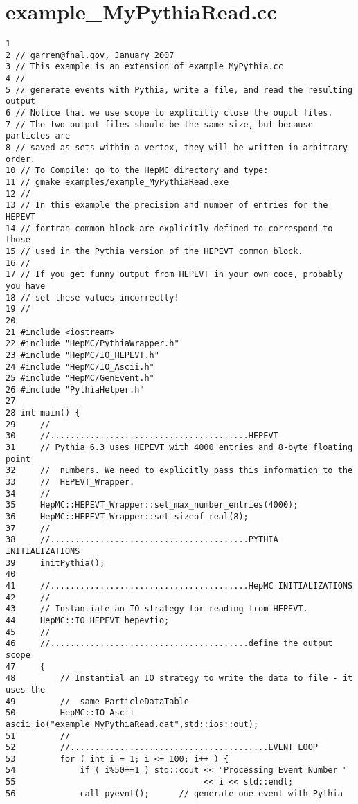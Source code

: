 \section{example\_\-My\-Pythia\-Read.cc}


\begin{DocInclude}\begin{verbatim}1 
2 // garren@fnal.gov, January 2007
3 // This example is an extension of example_MyPythia.cc
4 //  
5 // generate events with Pythia, write a file, and read the resulting output
6 // Notice that we use scope to explicitly close the ouput files.
7 // The two output files should be the same size, but because particles are
8 // saved as sets within a vertex, they will be written in arbitrary order.
10 // To Compile: go to the HepMC directory and type:
11 // gmake examples/example_MyPythiaRead.exe
12 //
13 // In this example the precision and number of entries for the HEPEVT 
14 // fortran common block are explicitly defined to correspond to those 
15 // used in the Pythia version of the HEPEVT common block. 
16 //
17 // If you get funny output from HEPEVT in your own code, probably you have
18 // set these values incorrectly!
19 //
20 
21 #include <iostream>
22 #include "HepMC/PythiaWrapper.h"
23 #include "HepMC/IO_HEPEVT.h"
24 #include "HepMC/IO_Ascii.h"
25 #include "HepMC/GenEvent.h"
26 #include "PythiaHelper.h"
27 
28 int main() { 
29     //
30     //........................................HEPEVT
31     // Pythia 6.3 uses HEPEVT with 4000 entries and 8-byte floating point
32     //  numbers. We need to explicitly pass this information to the 
33     //  HEPEVT_Wrapper.
34     //
35     HepMC::HEPEVT_Wrapper::set_max_number_entries(4000);
36     HepMC::HEPEVT_Wrapper::set_sizeof_real(8);
37     //
38     //........................................PYTHIA INITIALIZATIONS
39     initPythia();
40 
41     //........................................HepMC INITIALIZATIONS
42     //
43     // Instantiate an IO strategy for reading from HEPEVT.
44     HepMC::IO_HEPEVT hepevtio;
45     //
46     //........................................define the output scope
47     {
48         // Instantial an IO strategy to write the data to file - it uses the 
49         //  same ParticleDataTable
50         HepMC::IO_Ascii ascii_io("example_MyPythiaRead.dat",std::ios::out);
51         //
52         //........................................EVENT LOOP
53         for ( int i = 1; i <= 100; i++ ) {
54             if ( i%50==1 ) std::cout << "Processing Event Number " 
55                                      << i << std::endl;
56             call_pyevnt();      // generate one event with Pythia

\end{verbatim}
\end{DocInclude}
